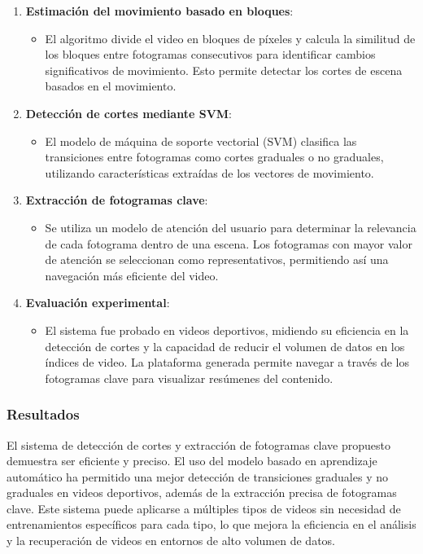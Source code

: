 \begin{enumerate}
	\item \textbf{Estimación del movimiento basado en bloques}:
	\begin{itemize}
		\item El algoritmo divide el video en bloques de píxeles y calcula la similitud de los bloques entre fotogramas consecutivos para identificar cambios significativos de movimiento. Esto permite detectar los cortes de escena basados en el movimiento.
	\end{itemize}
	
	\item \textbf{Detección de cortes mediante SVM}:
	\begin{itemize}
		\item El modelo de máquina de soporte vectorial (SVM) clasifica las transiciones entre fotogramas como cortes graduales o no graduales, utilizando características extraídas de los vectores de movimiento.
	\end{itemize}
	
	\item \textbf{Extracción de fotogramas clave}:
	\begin{itemize}
		\item Se utiliza un modelo de atención del usuario para determinar la relevancia de cada fotograma dentro de una escena. Los fotogramas con mayor valor de atención se seleccionan como representativos, permitiendo así una navegación más eficiente del video.
	\end{itemize}
	
	\item \textbf{Evaluación experimental}:
	\begin{itemize}
		\item El sistema fue probado en videos deportivos, midiendo su eficiencia en la detección de cortes y la capacidad de reducir el volumen de datos en los índices de video. La plataforma generada permite navegar a través de los fotogramas clave para visualizar resúmenes del contenido.
	\end{itemize}
\end{enumerate}

\subsubsection{Resultados}

El sistema de detección de cortes y extracción de fotogramas clave propuesto demuestra ser eficiente y preciso. El uso del modelo basado en aprendizaje automático ha permitido una mejor detección de transiciones graduales y no graduales en videos deportivos, además de la extracción precisa de fotogramas clave. Este sistema puede aplicarse a múltiples tipos de videos sin necesidad de entrenamientos específicos para cada tipo, lo que mejora la eficiencia en el análisis y la recuperación de videos en entornos de alto volumen de datos.


